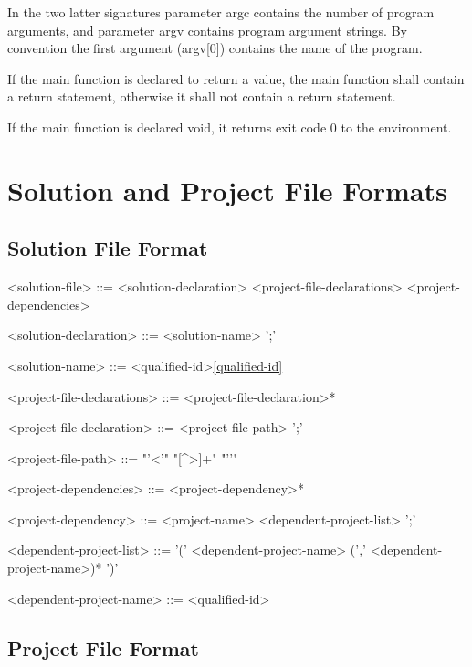 \documentclass[a4paper,oneside,11pt]{article}
\begin{document}
In the two latter signatures parameter argc contains the number of program arguments,
and parameter argv contains program argument strings.
By convention the first argument (argv[0]) contains the name of the program.

If the main function is declared to return a value, the main function shall contain
a return statement, otherwise it shall not contain a return statement.

If the main function is declared void, it returns exit code 0 to the environment.

\section{Solution and Project File Formats}

\subsection{Solution File Format}

\begin{grammar}
<solution-file> ::= <solution-declaration> <project-file-declarations> <project-dependencies>

<solution-declaration> ::=  <solution-name> ';'

<solution-name> ::= <qualified-id>\ref{qualified-id}

<project-file-declarations> ::= <project-file-declaration>*

<project-file-declaration> ::=  <project-file-path> ';'

<project-file-path> ::= "'<'" "[^>]+" "'\>'"

<project-dependencies> ::= <project-dependency>*

<project-dependency> ::=  <project-name> <dependent-project-list> ';'

<dependent-project-list> ::= '(' <dependent-project-name> (',' <dependent-project-name>)* ')'

<dependent-project-name> ::= <qualified-id>

\end{grammar}

\subsection{Project File Format}
\end{document}

